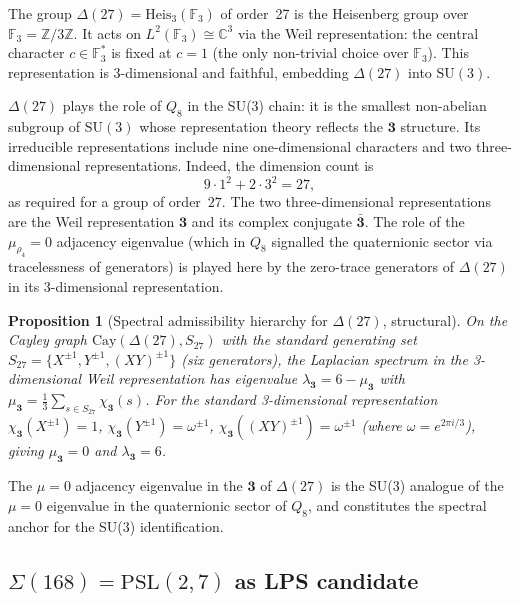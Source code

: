 \documentclass[11pt,a4paper]{article}
\newtheorem{proposition}[theorem]{Proposition}
\theoremstyle{definition}
\theoremstyle{remark}
\newcommand{\Heis}{\mathrm{Heis}}
\newcommand{\SU}{\mathrm{SU}}
\newcommand{\Z}{\mathbb{Z}}
\newcommand{\C}{\mathbb{C}}
\begin{document}
      The group $\Delta(27) = \Heis_3(\mathbb{F}_3)$ of order~27 is the Heisenberg group over
      $\mathbb{F}_3 = \Z/3\Z$.
      It acts on $L^2(\mathbb{F}_3) \cong \C^3$ via the Weil representation: the central character
      $c \in \mathbb{F}_3^*$ is fixed at $c = 1$ (the only non-trivial choice over $\mathbb{F}_3$).
      This representation is 3-dimensional and faithful, embedding $\Delta(27)$ into $\SU(3)$.

      $\Delta(27)$ plays the role of $Q_8$ in the SU(3) chain: it is the smallest non-abelian
      subgroup of $\SU(3)$ whose representation theory reflects the $\mathbf{3}$ structure.
      Its irreducible representations include nine one-dimensional characters and two
      three-dimensional representations.
      Indeed, the dimension count is
      \[
        9 \cdot 1^2 + 2 \cdot 3^2 = 27,
      \]
      as required for a group of order~$27$.
      The two three-dimensional representations are the Weil representation $\mathbf{3}$ and its
      complex conjugate $\bar{\mathbf{3}}$.
      The role of the $\mu_{\rho_4} = 0$ adjacency eigenvalue (which in $Q_8$ signalled the
      quaternionic sector via tracelessness of generators) is played here by the zero-trace
      generators of $\Delta(27)$ in its 3-dimensional representation.

      \begin{proposition}[Spectral admissibility hierarchy for $\Delta(27)$, structural]
        \label{prop:delta27-hierarchy}
        On the Cayley graph $\mathrm{Cay}(\Delta(27), S_{27})$ with the standard generating set
        $S_{27} = \{X^{\pm 1}, Y^{\pm 1}, (XY)^{\pm 1}\}$ (six generators), the Laplacian spectrum in
        the 3-dimensional Weil representation has eigenvalue $\lambda_{\mathbf{3}} = 6 - \mu_{\mathbf{3}}$
        with $\mu_{\mathbf{3}} = \tfrac{1}{3}\sum_{s \in S_{27}} \chi_{\mathbf{3}}(s)$.
        For the standard 3-dimensional representation $\chi_{\mathbf{3}}(X^{\pm 1}) = 1$,
        $\chi_{\mathbf{3}}(Y^{\pm 1}) = \omega^{\pm 1}$, $\chi_{\mathbf{3}}((XY)^{\pm 1}) = \omega^{\pm 1}$
        (where $\omega = e^{2\pi i/3}$), giving $\mu_{\mathbf{3}} = 0$ and $\lambda_{\mathbf{3}} = 6$.
      \end{proposition}

      The $\mu = 0$ adjacency eigenvalue in the $\mathbf{3}$ of $\Delta(27)$ is the SU(3) analogue
      of the $\mu = 0$ eigenvalue in the quaternionic sector of $Q_8$, and constitutes the
      spectral anchor for the SU(3) identification.

    \subsection{\texorpdfstring{$\Sigma(168) = \mathrm{PSL}(2,7)$}{Sigma(168)} as LPS candidate}
      \label{ssec:sigma168}
\end{document}

